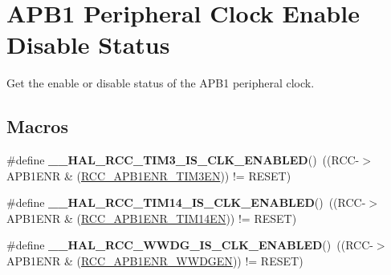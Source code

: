 \hypertarget{group___r_c_c___a_p_b1___peripheral___clock___enable___disable___status}{}\section{A\+P\+B1 Peripheral Clock Enable Disable Status}
\label{group___r_c_c___a_p_b1___peripheral___clock___enable___disable___status}


Get the enable or disable status of the A\+P\+B1 peripheral clock.  


\subsection*{Macros}
\begin{DoxyCompactItemize}
\item 
\mbox{\label{group___r_c_c___a_p_b1___peripheral___clock___enable___disable___status_gaf6090239db6a8a6917b3f3accea15ed0}} 
\#define {\bfseries \+\_\+\+\_\+\+H\+A\+L\+\_\+\+R\+C\+C\+\_\+\+T\+I\+M3\+\_\+\+I\+S\+\_\+\+C\+L\+K\+\_\+\+E\+N\+A\+B\+L\+ED}()~((R\+CC-\/$>$A\+P\+B1\+E\+NR \& (\hyperlink{group___peripheral___registers___bits___definition_ga75bfa33eb00ee30c6e22f7ceea464ac7}{R\+C\+C\+\_\+\+A\+P\+B1\+E\+N\+R\+\_\+\+T\+I\+M3\+EN}))  != R\+E\+S\+ET)
\item 
\mbox{\label{group___r_c_c___a_p_b1___peripheral___clock___enable___disable___status_gaf40a1f6a134b09aaa211ad159e613d1a}} 
\#define {\bfseries \+\_\+\+\_\+\+H\+A\+L\+\_\+\+R\+C\+C\+\_\+\+T\+I\+M14\+\_\+\+I\+S\+\_\+\+C\+L\+K\+\_\+\+E\+N\+A\+B\+L\+ED}()~((R\+CC-\/$>$A\+P\+B1\+E\+NR \& (\hyperlink{group___peripheral___registers___bits___definition_gaca040bd66d4a54d4d9e9b261c8102799}{R\+C\+C\+\_\+\+A\+P\+B1\+E\+N\+R\+\_\+\+T\+I\+M14\+EN})) != R\+E\+S\+ET)
\item 
\mbox{\label{group___r_c_c___a_p_b1___peripheral___clock___enable___disable___status_ga9b26aff2638d1e0613b0ce0530f0cd48}} 
\#define {\bfseries \+\_\+\+\_\+\+H\+A\+L\+\_\+\+R\+C\+C\+\_\+\+W\+W\+D\+G\+\_\+\+I\+S\+\_\+\+C\+L\+K\+\_\+\+E\+N\+A\+B\+L\+ED}()~((R\+CC-\/$>$A\+P\+B1\+E\+NR \& (\hyperlink{group___peripheral___registers___bits___definition_gaf712b922ee776a972d2efa3da0ea4733}{R\+C\+C\+\_\+\+A\+P\+B1\+E\+N\+R\+\_\+\+W\+W\+D\+G\+EN}))  != R\+E\+S\+ET)

\end{DoxyCompactItemize}
